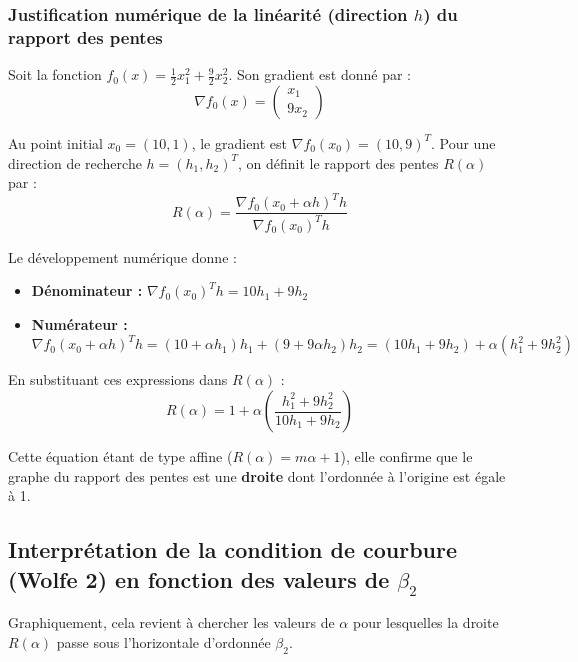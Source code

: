 \documentclass[a4paper,12pt]{article}
\begin{document}
	\subsubsection{Justification numérique de la linéarité (direction $h$) du rapport des pentes}
	
	Soit la fonction $f_0(x) = \frac{1}{2}x_1^2 + \frac{9}{2}x_2^2$. Son gradient est donné par :
	\begin{equation}
	\nabla f_0(x) = \begin{pmatrix} x_1 \\ 9x_2 \end{pmatrix}
	\end{equation}
	
	Au point initial $x_0 = (10, 1)$, le gradient est $\nabla f_0(x_0) = (10, 9)^T$. Pour une direction de recherche $h = (h_1, h_2)^T$, on définit le rapport des pentes $R(\alpha)$ par :
	\begin{equation}
	R(\alpha) = \frac{\nabla f_0(x_0 + \alpha h)^T h}{\nabla f_0(x_0)^T h}
	\end{equation}
	
	Le développement numérique donne :
	\begin{itemize}
		\item \textbf{Dénominateur :} $\nabla f_0(x_0)^T h = 10h_1 + 9h_2$
		\item \textbf{Numérateur :} $\nabla f_0(x_0 + \alpha h)^T h = (10 + \alpha h_1)h_1 + (9 + 9\alpha h_2)h_2 = (10h_1 + 9h_2) + \alpha(h_1^2 + 9h_2^2)$
	\end{itemize}
	
	En substituant ces expressions dans $R(\alpha)$ :
	\begin{equation}
	R(\alpha) = 1 + \alpha \left( \frac{h_1^2 + 9h_2^2}{10h_1 + 9h_2} \right)
	\end{equation}
	
	Cette équation étant de type affine ($R(\alpha) = m\alpha + 1$), elle confirme que le graphe du rapport des pentes est une \textbf{droite} dont l'ordonnée à l'origine est égale à 1.
	
	\subsection{Interprétation de la condition de courbure (Wolfe 2) en fonction des valeurs de $\beta_2$}
	
	Graphiquement, cela revient à chercher les valeurs de $\alpha$ pour lesquelles la droite $R(\alpha)$ passe sous l'horizontale d'ordonnée $\beta_2$.
	
\end{document}
